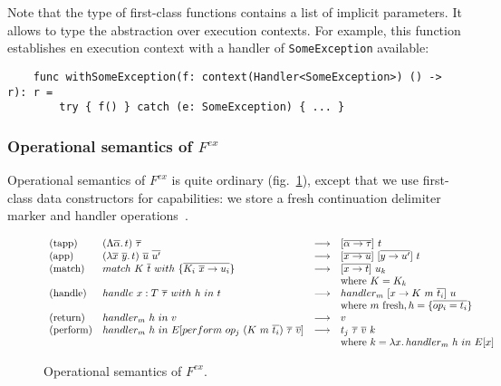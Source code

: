 \documentclass[acmsmall]{acmart}
\newcommand{\ap}{~}
\begin{document}
Note that the type of first-class functions contains a list of implicit parameters.
It allows to type the abstraction over execution contexts.
For example, this function establishes en execution context with a handler of \texttt{SomeException} available:
\begin{verbatim}
    func withSomeException(f: context(Handler<SomeException>) () -> r): r =
        try { f() } catch (e: SomeException) { ... }
\end{verbatim}


\subsubsection{Operational semantics of $F^{ex}$}

Operational semantics of $F^{ex}$ is quite ordinary (fig.\ \ref{fig:fex-operational}), except that we use first-class data constructors for capabilities: we store a fresh continuation delimiter marker and handler operations~\cite{xie2020effect}.

\begin{figure}
    \[
        \begin{array}{llll}
            \text{(tapp)} &(\Lambda \overline{\alpha}\ldotp t) \ap \overline{\tau} &\longrightarrow &[\overline{\alpha\to\tau}]\ap t
            \\
            \text{(app)} &(\lambda \overline{x}~\overline{y}\ldotp t) \ap \overline{u} \ap \overline{u'} &\longrightarrow &[\overline{x\to u}]\ap[\overline{y\to u'}]\ap t
            \\
            \text{(match)} &match ~K \ap \overline{t}~ with ~ \{ \overline{K_i \ap \overline{x} \to u_i}\} &\longrightarrow &[\overline{x\to t}]\ap u_k
            \\
            &&&\text{where } K = K_k
            \\
            \text{(handle)} &handle ~ x : T \ap \overline{\tau} ~with~h~in~t &\longrightarrow & handler_m ~[x \to K \ap m \ap \overline{t_i}] \ap u
            \\
            &&&\text{where } m \text{ fresh}, h = \{\overline{op_i = t_i}\}
            \\
            \text{(return)} &handler_m ~h ~ in ~v &\longrightarrow & v
            \\
            \text{(perform)} &handler_m~h~in~E[perform \ap op_j\ap (K \ap m \ap \overline{t_i})\ap\overline{\tau}\ap\overline{v}] &\longrightarrow &t_j \ap \overline{\tau}\ap \overline{v}\ap k
            \\
            &&&\text{where } k = \lambda x\ldotp handler_m~h~in~E[x]
        \end{array}
    \]
    \caption{Operational semantics of $F^{ex}$.} %
    \label{fig:fex-operational}
\end{figure}
\end{document}
